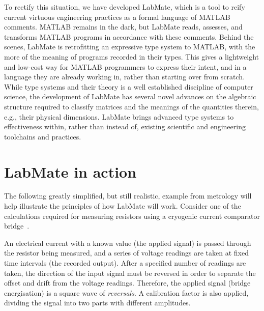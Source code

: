 \documentclass{IMEKO2024}
\begin{document}
To rectify this situation, we have developed LabMate, which is a tool
to reify current virtuous engineering practices as a formal language
of MATLAB comments. MATLAB remains in the dark, but LabMate reads,
assesses, and transforms MATLAB programs in accordance with these
comments.
%
Behind the scenes, LabMate is retrofitting an expressive type system
to MATLAB, with the more of the meaning of programs recorded in their
types.
%
This gives a lightweight and low-cost way for MATLAB programmers to
express their intent, and in a language they are already working in,
rather than starting over from scratch.
%
While type systems and their theory is a well established discipline
of computer science, the development of LabMate has several novel
advances on the algebraic structure required to classify
matrices and the meanings of the quantities therein, e.g., their
physical dimensions. LabMate brings advanced type systems to
effectiveness within, rather than instead of, existing scientific and
engineering toolchains and practices.

\section{LabMate in action}
\label{sec:example}


The following greatly simplified, but still realistic, example from metrology  will help illustrate the principles of how LabMate will work. Consider one of the calculations required for measuring resistors using a cryogenic current comparator bridge~\cite{Williams_2010}.

An electrical current with a known value (the applied signal) is passed through the resistor being measured, and a series of voltage readings are taken at fixed time intervals (the recorded output). After a specified number of readings are taken, the direction of the input signal must be reversed in order to separate the offset and drift from the voltage readings. Therefore, the applied signal (bridge energisation) is a square wave of {\em reversals}. A calibration factor is also applied, dividing the signal into two parts with different amplitudes.
\end{document}
